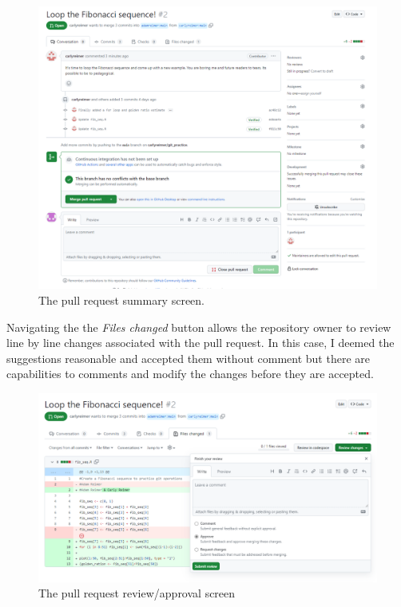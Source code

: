 \documentclass[
  letterpaper,
  DIV=11,
  numbers=noendperiod]{scrreprt}
\begin{document}
\begin{figure}

{\centering \includegraphics{pull_request_AR.PNG}

}

\caption{The pull request summary screen.}

\end{figure}

Navigating the the \emph{Files changed} button allows the repository
owner to review line by line changes associated with the pull request.
In this case, I deemed the suggestions reasonable and accepted them
without comment but there are capabilities to comments and modify the
changes before they are accepted.

\begin{figure}

{\centering \includegraphics{pull_request_AR_approve.PNG}

}

\caption{The pull request review/approval screen}

\end{figure}
\end{document}

